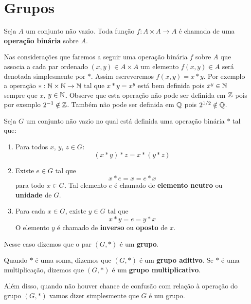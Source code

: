\chapter{Grupos}

\begin{definicao}
   Seja $A$ um conjunto n\~ao vazio. Toda fun\c{c}\~ao $f : A \times A \to A$ \'e chamada de uma \textbf{opera\c{c}\~ao bin\'aria} sobre $A$.
\end{definicao}

Nas considera\c{c}\~oes que faremos a seguir uma opera\c{c}\~ao bin\'aria $f$ sobre $A$ que associa a cada par ordenado $(x, y) \in A \times A$ um elemento $f(x, y) \in A$ ser\'a denotada simplesmente por $*$. Assim escreveremos $f(x, y) = x*y$. Por exemplo a opera\c{c}\~ao $* : \mathbb{N} \times \mathbb{N} \to \mathbb{N}$ tal que $x*y = x^y$ est\'a bem definida pois $x^y \in \mathbb{N}$ sempre que $x$, $y \in \mathbb{N}$. Observe que esta opera\c{c}\~ao n\~ao pode ser definida em $\mathbb{Z}$ pois por exemplo $2^{-1} \notin \mathbb{Z}$. Tamb\'em n\~ao pode ser definida em $\mathbb{Q}$ pois $2^{1/2} \notin \mathbb{Q}$.

\begin{definicao}
	Seja $G$ um conjunto n{\~a}o vazio no qual está definida uma opera{\c c}{\~a}o bin{\'a}ria $*$ tal que:
	\begin{enumerate}[label={\roman*})]
		\item Para todos $x$, $y$, $z\in G$:
		\[
			(x*y)*z=x*(y*z)
		\]
		
		\item Existe $e \in G$ tal que
		\[
			x*e = x = e*x
		\]
		para todo $x \in G$. Tal elemento $e$ {\'e} chamado de \textbf{elemento neutro} ou \textbf{unidade} de $G$.

		\item Para cada $x \in G$, existe $y \in G$ tal que
		\[
			x*y = e = y*x
		\]
		O elemento $y$ {\'e} chamado de \textbf{inverso} ou \textbf{oposto} de $x$.
	\end{enumerate}
	Nesse caso dizemos que o par $(G, *)$ é um \textbf{grupo}.
\end{definicao}

\begin{observacao}
	Quando $*$ {\'e} uma soma, dizemos que $(G,*)$ {\'e} um \textbf{grupo aditivo}. Se $*$ {\'e} uma multiplica{\c c}{\~a}o, dizemos que $(G,*)$ {\'e} um \textbf{grupo multiplicativo}.

	Além disso, quando não houver chance de confusão com relação à operação do grupo $(G, *)$ vamos dizer simplesmente que $G$ é um grupo.
\end{observacao}

